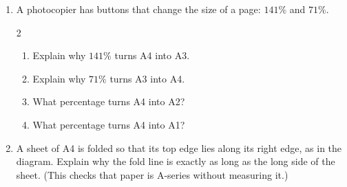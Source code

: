 \documentclass[11pt,a4paper]{article}
\begin{document}
\begin{enumerate}[resume]
\item A photocopier has buttons that change the size of a page: $141\%$ and
$71\%$.
\begin{multicols}{2}
\begin{enumerate}
  \item Explain why $141\%$ turns A4 into A3.
  \item Explain why $71\%$ turns A3 into A4.
  \item What percentage turns A4 into A2?
  \item What percentage turns A4 into A1?
\end{enumerate}
\end{multicols}

\item
\begin{minipage}[t]{0.76\linewidth}
A sheet of A4 is folded so that its top edge lies along its right edge, as in
the diagram. Explain why the fold line is exactly as long as the long side of
the sheet. (This checks that paper is A-series without measuring it.)
\end{minipage}\hfill
\begin{minipage}[t]{0.2\linewidth}
\vspace{0pt}
\centering
{}
\end{minipage}

\end{enumerate}

\newpage

\end{document}
